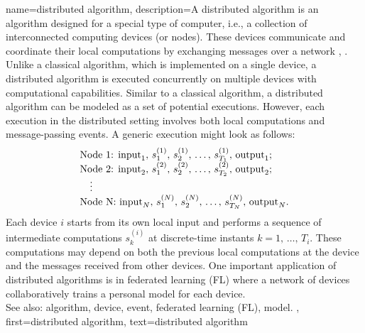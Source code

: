 {
{name={distributed algorithm},
	description={A distributed algorithm is an algorithm designed for 
		a special type of computer, i.e., a collection of interconnected computing devices (or nodes). 
		These devices communicate and coordinate their local computations by exchanging 
		messages over a network \cite{IntroDistAlg}, \cite{ParallelDistrBook}. Unlike a classical algorithm, 
		which is implemented on a single device, a distributed algorithm is 
		executed concurrently on multiple devices with computational capabilities. 
		Similar to a classical algorithm, a distributed algorithm can be modeled as a 
		set of potential executions. However, each execution in the distributed setting involves 
		both local computations and message-passing events. A generic execution might look as 
		follows:
		\[
		\begin{array}{l}
			\text{Node 1: } {\rm input}_1, \,s_1^{(1)}, \,s_2^{(1)}, \,\ldots, \,s_{T_1}^{(1)}, \,{\rm output}_1; \\
			\text{Node 2: } {\rm input}_2, \,s_1^{(2)}, \,s_2^{(2)}, \,\ldots, \,s_{T_2}^{(2)}, \,{\rm output}_2; \\
			\quad \vdots \\
			\text{Node N: } {\rm input}_N, \,s_1^{(N)}, \,s_2^{(N)}, \,\ldots, \,s_{T_N}^{(N)}, \,{\rm output}_N.
		\end{array}
		\]
		Each device $i$ starts from its own local input and performs a sequence of 
		intermediate computations $s_{k}^{(i)}$ at discrete-time instants $k = 1, \,\dots, \,T_i$. 
		These computations may depend on both the previous local computations at the device 
		and the messages received from other devices. One important application of distributed 
		algorithms is in federated learning (FL) where a network of devices collaboratively trains a personal model 
		for each device. 
					\\ 
		See also: algorithm, device, event, federated learning (FL), model.
		},
	first={distributed algorithm}, 
	text={distributed algorithm}
}


}
